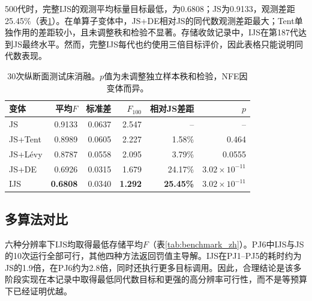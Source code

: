 \documentclass[preprint,12pt]{elsarticle}
\begin{document}
500代时，完整IJS的观测平均标量目标最低，为0.6808；JS为0.9133，观测差距25.45\%（表\ref{tab:ablation_zh}）。在单算子变体中，JS+DE相对JS的同代数观测差距最大；Tent单独作用的差距较小，且未调整秩和检验不显著。存储收敛记录中，IJS在第187代达到JS最终水平。然而，完整IJS每代也约使用三倍目标评价，因此表格只能说明同代数表现。

\begin{table}[t]
\centering
\caption{30次纵断面测试床消融。$p$值为未调整独立样本秩和检验，NFE因变体而异。}
\label{tab:ablation_zh}
\begin{tabular}{lrrrrr}
\toprule
变体 & 平均$F$ & 标准差 & $F_{100}$ & 相对JS差距 & $p$ \\
\midrule
JS & 0.9133 & 0.0637 & 2.547 & -- & -- \\
JS+Tent & 0.8989 & 0.0605 & 2.227 & 1.58\% & 0.464 \\
JS+L\'evy & 0.8787 & 0.0558 & 2.095 & 3.79\% & 0.0555 \\
JS+DE & 0.6926 & 0.0315 & 1.679 & 24.17\% & $3.02\times10^{-11}$ \\
IJS & \textbf{0.6808} & 0.0340 & \textbf{1.292} & \textbf{25.45\%} & $3.02\times10^{-11}$ \\
\bottomrule
\end{tabular}
\end{table}

\subsection{多算法对比}

六种分辨率下IJS均取得最低存储平均$F$（表\ref{tab:benchmark_zh}）。PJ6中IJS与JS的10次运行全部可行，其他四种方法返回罚值主导解。IJS在PJ1--PJ5的耗时约为JS的1.9倍，在PJ6约为2.8倍，同时还执行更多目标调用。因此，合理结论是该多阶段实现在本记录中取得最低同代数目标和更强的高分辨率可行性，而不是等预算下已经证明优越。
\end{document}
